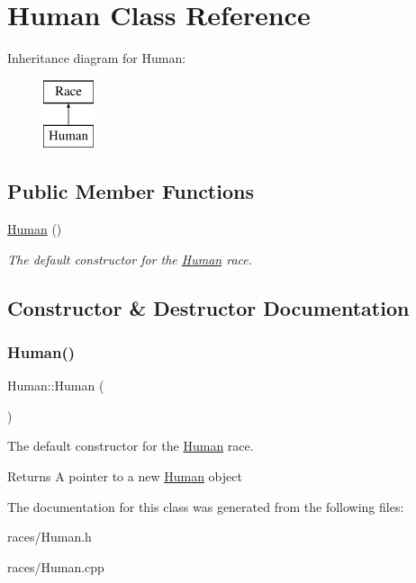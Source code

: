 \hypertarget{class_human}{}\section{Human Class Reference}
\label{class_human}
Inheritance diagram for Human\+:\begin{figure}[H]
\begin{center}
\leavevmode
\includegraphics[height=2.000000cm]{class_human}
\end{center}
\end{figure}
\subsection*{Public Member Functions}
\begin{DoxyCompactItemize}
\item 
\mbox{\hyperlink{class_human_a4f84fcddcedd434023a001eba00a095c}{Human}} ()
\begin{DoxyCompactList}\small\item\em The default constructor for the \mbox{\hyperlink{class_human}{Human}} race. \end{DoxyCompactList}\end{DoxyCompactItemize}


\subsection{Constructor \& Destructor Documentation}
\mbox{\label{class_human_a4f84fcddcedd434023a001eba00a095c}} 
\subsubsection{\texorpdfstring{Human()}{Human()}}
{\footnotesize\ttfamily Human\+::\+Human (\begin{DoxyParamCaption}{ }\end{DoxyParamCaption})}



The default constructor for the \mbox{\hyperlink{class_human}{Human}} race. 

\begin{DoxyReturn}{Returns}
A pointer to a new \mbox{\hyperlink{class_human}{Human}} object 
\end{DoxyReturn}


The documentation for this class was generated from the following files\+:\begin{DoxyCompactItemize}
\item 
races/Human.\+h\item 
races/Human.\+cpp\end{DoxyCompactItemize}
